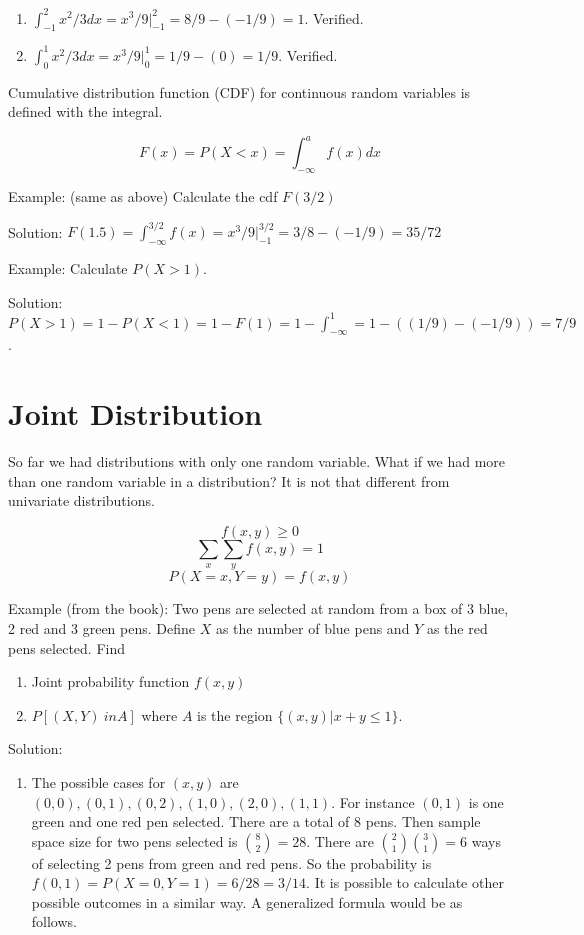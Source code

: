 \documentclass[]{book}
\providecommand{\tightlist}{%
  \setlength{\itemsep}{0pt}\setlength{\parskip}{0pt}}
\theoremstyle{definition}
\theoremstyle{definition}
\theoremstyle{definition}
\theoremstyle{remark}
\begin{document}
\begin{enumerate}
\def\labelenumi{\alph{enumi}.}
\tightlist
\item
  \(\int_{-1}^2 x^2/3 dx = x^3/9|_{-1}^2 = 8/9 - (-1/9) = 1\). Verified.
\item
  \(\int_{0}^1 x^2/3 dx = x^3/9|_{0}^1 = 1/9 - (0) = 1/9\). Verified.
\end{enumerate}

Cumulative distribution function (CDF) for continuous random variables
is defined with the integral.

\[F(x) = P(X < x) = \int_{- \infty}^a f(x)dx\]

Example: (same as above) Calculate the cdf \(F(3/2)\)

Solution:
\(F(1.5) = \int_{- \infty}^{3/2} f(x) = x^3/9|_{-1}^{3/2} = 3/8 - (-1/9) = 35/72\)

Example: Calculate \(P(X > 1)\).

Solution:
\(P(X > 1) = 1 - P(X < 1) = 1 - F(1) = 1 - \int_{- \infty}^{1} = 1 - ((1/9) - (-1/9)) = 7/9\).

\hypertarget{joint-distribution}{%
\section{Joint Distribution}\label{joint-distribution}}

So far we had distributions with only one random variable. What if we
had more than one random variable in a distribution? It is not that
different from univariate distributions.

\[f(x,y) \ge 0\] \[\sum_x\sum_y f(x,y) = 1\] \[P(X=x,Y=y) = f(x,y)\]

Example (from the book): Two pens are selected at random from a box of 3
blue, 2 red and 3 green pens. Define \(X\) as the number of blue pens
and \(Y\) as the red pens selected. Find

\begin{enumerate}
\def\labelenumi{\alph{enumi}.}
\tightlist
\item
  Joint probability function \(f(x,y)\)
\item
  \(P[(X,Y) \ in A]\) where \(A\) is the region \(\{(x,y)|x+y \le 1\}\).
\end{enumerate}

Solution:

\begin{enumerate}
\def\labelenumi{\alph{enumi}.}
\tightlist
\item
  The possible cases for \((x,y)\) are
  \((0,0),(0,1),(0,2),(1,0),(2,0),(1,1)\). For instance \((0,1)\) is one
  green and one red pen selected. There are a total of 8 pens. Then
  sample space size for two pens selected is \(\binom{8}{2} = 28\).
  There are \(\binom{2}{1}\binom{3}{1} = 6\) ways of selecting 2 pens
  from green and red pens. So the probability is
  \(f(0,1) = P(X=0,Y=1) = 6/28 = 3/14\). It is possible to calculate
  other possible outcomes in a similar way. A generalized formula would
  be as follows.
\end{enumerate}
\end{document}
